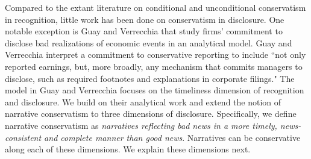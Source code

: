 \documentclass[letterpaper,12pt]{article}
\begin{document}
\begin{spacing}{1.5}
Compared to the extant literature on conditional and unconditional conservatism in recognition, little work has been done on conservatism in disclosure. One notable exception is Guay and Verrecchia \citeyear{guayConservativeDisclosure2018} that study firms' commitment to disclose bad realizations of economic events in an analytical model. Guay and Verrecchia \citeyear[p. 73]{guayConservativeDisclosure2018} interpret a commitment to conservative reporting to include ``not only reported earnings, but, more broadly, any mechanism that commits managers to disclose, such as required footnotes and explanations in corporate filings." The model in Guay and Verrecchia \citeyear{guayConservativeDisclosure2018} focuses on the timeliness dimension of recognition and disclosure. We build on their analytical work and extend the notion of narrative conservatism to three dimensions of disclosure. Specifically, we define narrative conservatism as \textit{narratives reflecting bad news in a more timely, news-consistent and complete manner than good news}. Narratives can be conservative along each of these dimensions. We explain these dimensions next.
\begin{comment}
	As \citeA[p. 243]{kothariManagersWithholdBad2009} state:
	\begin{adjustwidth}{1cm}{1cm}
	\begin{singlespace}
	\textit{Considerable research examines conservative} recognition \textit{in accounting in the United States and internationally (Basu [1997], Ball, Kothari, and Robin [2000], McNichols [1988]). However, there is little systematic evidence to suggest conservatism in firms’} disclosure \textit{practices, with the notable exception of disclosure of bad news to mitigate litigation risk.}
	\end{singlespace}
	\end{adjustwidth}
	In a recent analytical work, \citeA[pp. 73-74]{guayConservativeDisclosure2018} have expressed similar opinions:
	\begin{adjustwidth}{1cm}{1cm}
	\begin{singlespace}
	\textit{By way of an analogy, 20 years ago, much of the accounting literature on transparent financial disclosure emphasized constructs such as earnings timeliness, high-quality accruals, and asset/liability recognition. Today, scholars study a plethora of additional financial disclosure mechanisms, including management forecasts, conference calls, management discussion and analysis (MD\&A) disclosure, press releases, and social media outlets. A commitment to timely disclosure of bad news need not come exclusively through financial statement recognition, and we believe that a broader view of conservative disclosure will offer new paths forward for a literature that has struggled to develop theories to explain the efficiency of timely asymmetric earnings numbers. We encourage researchers to pursue these avenues to better understand how the very large literature on conservative financial reporting integrates with the equally large literature on corporate disclosure.}

\end{comment}
\end{spacing}
\end{document}
